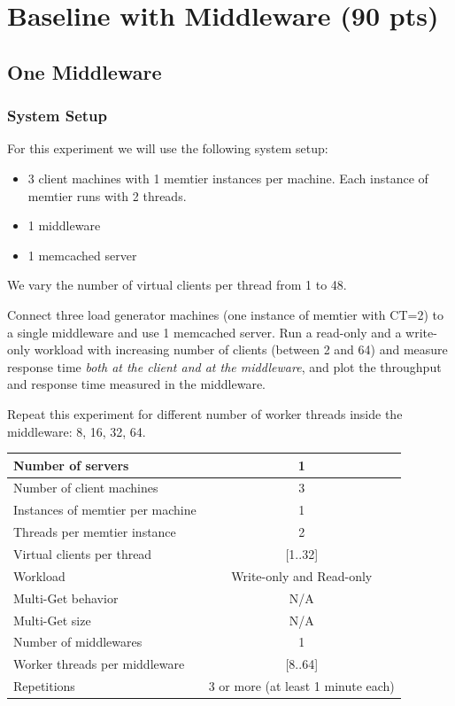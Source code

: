 \documentclass[11pt,a4paper]{article}
\begin{document}
\section{Baseline with Middleware (90 pts)}
%
\subsection{One Middleware}
%
\subsubsection{System Setup}
%
For this experiment we will use the following system setup:
%
\begin{itemize}
	\item 3 client machines with 1 memtier instances per machine. Each instance of memtier runs with 2 threads.
	\item 1 middleware
	\item 1 memcached server
\end{itemize}
%
We vary the number of virtual clients per thread from 1 to 48.
%

Connect three load generator machines (one instance of memtier with CT=2) to a single middleware and use 1 memcached server. Run a read-only and a write-only workload with increasing number of clients (between 2 and 64) and measure response time \emph{both at the client and at the middleware}, and plot the throughput and response time measured in the middleware.

Repeat this experiment for different number of worker threads inside the middleware: 8, 16, 32, 64.

\begin{center}
	\scriptsize{
		\begin{tabular}{|l|c|}
			\hline Number of servers                & 1                        \\ 
			\hline Number of client machines        & 3                        \\ 
			\hline Instances of memtier per machine & 1                        \\ 
			\hline Threads per memtier instance     & 2                        \\
			\hline Virtual clients per thread       & [1..32]                  \\ 
			\hline Workload                         & Write-only and Read-only \\
			\hline Multi-Get behavior               & N/A                      \\
			\hline Multi-Get size                   & N/A                      \\
			\hline Number of middlewares            & 1                        \\
			\hline Worker threads per middleware    & [8..64]                  \\
			\hline Repetitions                      & 3 or more (at least 1 minute each)                \\ 
			\hline 
		\end{tabular}
	} 
\end{center}
\end{document}
